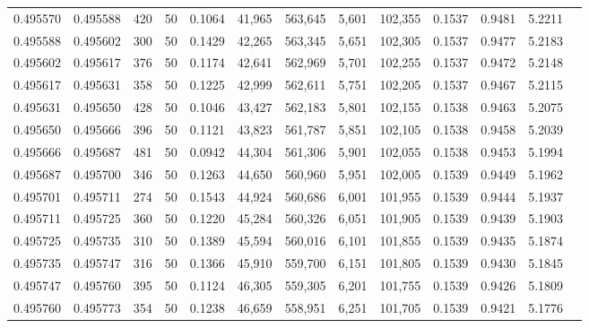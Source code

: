 \begin{tabular}{rrrrrrrrrrrrr}
0.495570 & 0.495588 & 420 &  50 &                                     0.1064 &  41,965 & 563,645 &   5,601 & 102,355 & 0.1537 & 0.9481 & 5.2211 \\
0.495588 & 0.495602 & 300 &  50 &                                     0.1429 &  42,265 & 563,345 &   5,651 & 102,305 & 0.1537 & 0.9477 & 5.2183 \\
0.495602 & 0.495617 & 376 &  50 &                                     0.1174 &  42,641 & 562,969 &   5,701 & 102,255 & 0.1537 & 0.9472 & 5.2148 \\
0.495617 & 0.495631 & 358 &  50 &                                     0.1225 &  42,999 & 562,611 &   5,751 & 102,205 & 0.1537 & 0.9467 & 5.2115 \\
0.495631 & 0.495650 & 428 &  50 &                                     0.1046 &  43,427 & 562,183 &   5,801 & 102,155 & 0.1538 & 0.9463 & 5.2075 \\
0.495650 & 0.495666 & 396 &  50 &                                     0.1121 &  43,823 & 561,787 &   5,851 & 102,105 & 0.1538 & 0.9458 & 5.2039 \\
0.495666 & 0.495687 & 481 &  50 &                                     0.0942 &  44,304 & 561,306 &   5,901 & 102,055 & 0.1538 & 0.9453 & 5.1994 \\
0.495687 & 0.495700 & 346 &  50 &                                     0.1263 &  44,650 & 560,960 &   5,951 & 102,005 & 0.1539 & 0.9449 & 5.1962 \\
0.495701 & 0.495711 & 274 &  50 &                                     0.1543 &  44,924 & 560,686 &   6,001 & 101,955 & 0.1539 & 0.9444 & 5.1937 \\
0.495711 & 0.495725 & 360 &  50 &                                     0.1220 &  45,284 & 560,326 &   6,051 & 101,905 & 0.1539 & 0.9439 & 5.1903 \\
0.495725 & 0.495735 & 310 &  50 &                                     0.1389 &  45,594 & 560,016 &   6,101 & 101,855 & 0.1539 & 0.9435 & 5.1874 \\
0.495735 & 0.495747 & 316 &  50 &                                     0.1366 &  45,910 & 559,700 &   6,151 & 101,805 & 0.1539 & 0.9430 & 5.1845 \\
0.495747 & 0.495760 & 395 &  50 &                                     0.1124 &  46,305 & 559,305 &   6,201 & 101,755 & 0.1539 & 0.9426 & 5.1809 \\
0.495760 & 0.495773 & 354 &  50 &                                     0.1238 &  46,659 & 558,951 &   6,251 & 101,705 & 0.1539 & 0.9421 & 5.1776 \\

\end{tabular}
